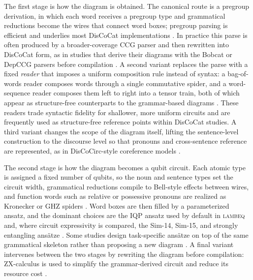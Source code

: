 \documentclass{ieeeaccess}
\begin{document}
The first stage is how the diagram is obtained. The canonical route is a pregroup derivation, in which each word receives a pregroup type and grammatical reductions become the wires that connect word boxes; pregroup parsing is efficient and underlies most DisCoCat implementations \cite{meichanetzidis_quantum_2021,meichanetzidis_grammar-aware_2023,lorenz_qnlp_2023}. In practice this parse is often produced by a broader-coverage CCG parser and then rewritten into DisCoCat form, as in studies that derive their diagrams with the Bobcat or DepCCG parsers before compilation \cite{abiwardani_generalized_2025,ruskanda_quantum_2022,r_quantum_2023}. A second variant replaces the parse with a fixed \emph{reader} that imposes a uniform composition rule instead of syntax: a bag-of-words reader composes words through a single commutative spider, and a word-sequence reader composes them left to right into a tensor train, both of which appear as structure-free counterparts to the grammar-based diagrams \cite{lorenz_qnlp_2023,liu_research_2024,peral-garcia_comparing_2024}. These readers trade syntactic fidelity for shallower, more uniform circuits and are frequently used as structure-free reference points within DisCoCat studies. A third variant changes the scope of the diagram itself, lifting the sentence-level construction to the discourse level so that pronouns and cross-sentence reference are represented, as in DisCoCirc-style coreference models \cite{wazni_large_2024}.

The second stage is how the diagram becomes a qubit circuit. Each atomic type is assigned a fixed number of qubits, so the noun and sentence types set the circuit width, grammatical reductions compile to Bell-style effects between wires, and function words such as relative or possessive pronouns are realized as Kronecker or GHZ spiders \cite{meichanetzidis_grammar-aware_2023}. Word boxes are then filled by a parameterized ansatz, and the dominant choices are the IQP ansatz used by default in \textsc{lambeq} and, where circuit expressivity is compared, the Sim-14, Sim-15, and strongly entangling ans\"atze \cite{lorenz_qnlp_2023,castillo_comparative_2025}. Some studies design task-specific ans\"atze on top of the same grammatical skeleton rather than proposing a new diagram \cite{ruskanda_simple_2023,abiwardani_generalized_2025}. A final variant intervenes between the two stages by rewriting the diagram before compilation: ZX-calculus is used to simplify the grammar-derived circuit and reduce its resource cost \cite{sreedhar_towards_2025}.
\end{document}
